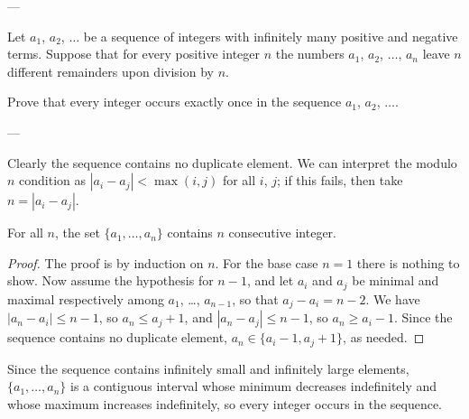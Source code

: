 
---

Let $a_1$, $a_2$, $\ldots$ be a sequence of integers with infinitely many positive and negative terms. Suppose that for every positive integer $n$ the numbers $a_1$, $a_2$, $\ldots$, $a_n$ leave $n$ different remainders upon division by $n$.

Prove that every integer occurs exactly once in the sequence $a_1$, $a_2$, $\ldots$.

---

Clearly the sequence contains no duplicate element. We can interpret the modulo $n$ condition as $|a_i-a_j|<\max(i,j)$ for all $i$, $j$; if this fails, then take $n=|a_i-a_j|$.
\begin{claim*}
    For all $n$, the set $\{a_1,\ldots,a_n\}$ contains $n$ consecutive integer.
\end{claim*}
\begin{proof}
    The proof is by induction on $n$. For the base case $n=1$ there is nothing to show. Now assume the hypothesis for $n-1$, and let $a_i$ and $a_j$ be minimal and maximal respectively among $a_1$, \ldots, $a_{n-1}$, so that $a_j-a_i=n-2$. We have $|a_n-a_i|\le n-1$, so $a_n\le a_j+1$, and $|a_n-a_j|\le n-1$, so $a_n\ge a_i-1$. Since the sequence contains no duplicate element, $a_n\in\{a_i-1,a_j+1\}$, as needed.
\end{proof}

Since the sequence contains infinitely small and infinitely large elements, $\{a_1,\ldots,a_n\}$ is a contiguous interval whose minimum decreases indefinitely and whose maximum increases indefinitely, so every integer occurs in the sequence.

